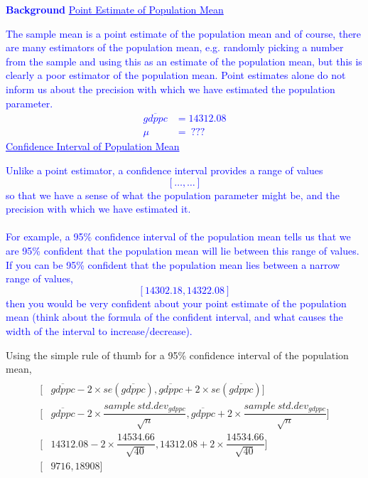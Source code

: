 \documentclass[12pt]{report}
\newenvironment{blueframed}[1][blue]
{\def\FrameCommand{\fboxsep=\FrameSep\fcolorbox{#1}{white}}%
\MakeFramed {\advance\hsize-\width \FrameRestore}}
{\endMakeFramed}
\begin{document}
\justify
\begin{blueframed}
	\textcolor{blue}{\textbf{Background}}
	\vspace{-\baselineskip}
	\justify
	\textcolor{blue}{\underline{Point Estimate of Population Mean}}
	
	\noindent \textcolor{blue}
	{
		The sample mean is a point estimate of the population mean and of course, there are many estimators of the population mean, e.g. randomly picking a number from the sample and using this as an estimate of the population mean, but this is clearly a poor estimator of the population mean. Point estimates alone do not inform us about the precision with which we have estimated the population parameter. \begin{align*}
		 \overline{gdppc} &= 14312.08 \\
		 \mu &=\ ???
		\end{align*} \underline{Confidence Interval of Population Mean}
	}
	
	\noindent \textcolor{blue}
	{
		Unlike a point estimator, a confidence interval provides a range of values $$[\dots,\dots]$$ so that we have a sense of what the population parameter might be, and the precision with which we have estimated it. \\ \\ For example, a 95\% confidence interval of the population mean tells us that we are 95\% confident that the population mean will lie between this range of values. If you can be 95\% confident that the population mean lies between a narrow range of values, $$[14302.18,14322.08]$$ then you would be very confident about your point estimate of the population mean (think about the formula of the confident interval, and what causes the width of the interval to increase/decrease). 
	}
\end{blueframed}

\noindent Using the simple rule of thumb for a 95\% confidence interval of the population mean, 
\begin{align*}
	[&\overline{gdppc} \pm 2 \times se(\overline{gdppc})] \\
	[&\overline{gdppc} - 2 \times se(\overline{gdppc}), \overline{gdppc} + 2 \times se(\overline{gdppc})] \\
	[&\overline{gdppc} - 2 \times \dfrac{sample\ std.dev_{gdppc}}{\sqrt{n}}, \overline{gdppc} + 2 \times \dfrac{sample\ std.dev_{gdppc}}{\sqrt{n}}] \\
	[&14312.08 - 2 \times \dfrac{14534.66}{\sqrt{40}}, 14312.08 + 2 \times \dfrac{14534.66}{\sqrt{40}}] \\
	[&9716,18908]
\end{align*}
\end{document}
